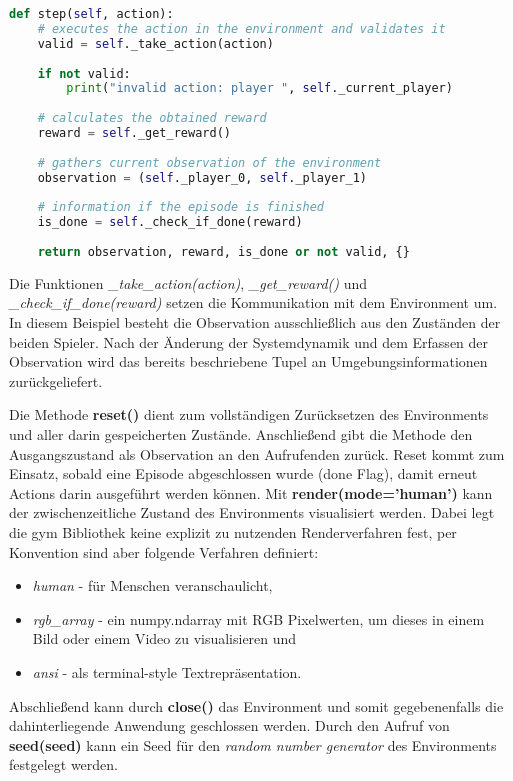 \documentclass[11pt]{scrartcl}
\begin{document}
\newpage
\begin{lstlisting}[language=Python, caption=step method, label=lst:step-method]
def step(self, action):
	# executes the action in the environment and validates it
	valid = self._take_action(action)
	
	if not valid:
		print("invalid action: player ", self._current_player)
	
	# calculates the obtained reward
	reward = self._get_reward()
	
	# gathers current observation of the environment
	observation = (self._player_0, self._player_1)
	
	# information if the episode is finished
	is_done = self._check_if_done(reward)
    
	return observation, reward, is_done or not valid, {}
\end{lstlisting}
\noindent
Die Funktionen \textit{\_take\_action(action)}, \textit{\_get\_reward()} und
\textit{\_check\_if\_done(reward)} setzen die Kommunikation mit dem Environment um. In
diesem Beispiel besteht die Observation ausschließlich aus den Zuständen der beiden Spieler.
Nach der Änderung der Systemdynamik und dem Erfassen der Observation wird das bereits
beschriebene Tupel an Umgebungsinformationen zurückgeliefert.

Die Methode \textbf{reset()} dient zum vollständigen Zurücksetzen des Environments und aller
darin gespeicherten Zustände. Anschließend gibt die Methode den Ausgangszustand als Observation
an den Aufrufenden zurück. Reset kommt zum Einsatz, sobald eine Episode abgeschlossen wurde
(done Flag), damit erneut Actions darin ausgeführt werden können.
\newline
\noindent
Mit \textbf{render(mode='human')} kann der zwischenzeitliche Zustand des Environments
visualisiert werden. Dabei legt die gym Bibliothek keine explizit zu nutzenden Renderverfahren
fest, per Konvention sind aber folgende Verfahren definiert: 

\begin{itemize}
\itemsep0pt
\item \textit{human} - für Menschen veranschaulicht, 
\item \textit{rgb\_array} - ein numpy.ndarray mit RGB Pixelwerten, um dieses in einem Bild oder einem 
Video zu visualisieren und 
\item \textit{ansi} - als terminal-style Textrepräsentation.
\end{itemize}
\noindent
Abschließend kann durch \textbf{close()} das Environment und somit gegebenenfalls die 
dahinterliegende Anwendung geschlossen werden. Durch den Aufruf von 
\textbf{seed(seed)} kann ein Seed für den \textit{random number generator}
des Environments festgelegt werden.
\end{document}
